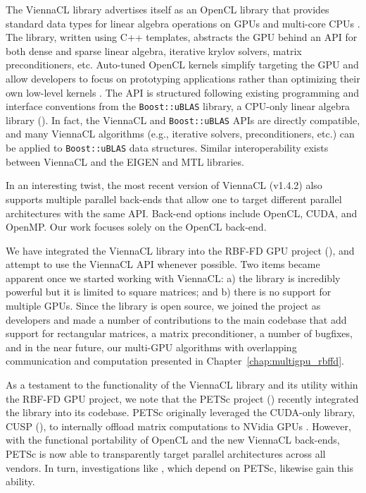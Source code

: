 \documentclass{report}
\begin{document}
The ViennaCL library advertises itself as an OpenCL library that provides standard data types for linear algebra operations on GPUs and multi-core CPUs \cite{Rupp2010}. The library, written using C++ templates, abstracts the GPU behind an API for both dense and sparse linear algebra, iterative krylov solvers, matrix preconditioners, etc. Auto-tuned OpenCL kernels simplify targeting the GPU and allow developers to focus on prototyping applications rather than optimizing their own low-level kernels \cite{Rupp2010a}. 
The API is structured following existing programming and interface conventions from the \texttt{Boost::uBLAS} library, a CPU-only linear algebra library (\cite{BoostSite}). In fact, the ViennaCL and \texttt{Boost::uBLAS} APIs are directly compatible, and many ViennaCL algorithms (e.g., iterative solvers, preconditioners, etc.) can be applied to \texttt{Boost::uBLAS} data structures. Similar interoperability exists between ViennaCL and the EIGEN and MTL libraries. 

In an interesting twist, the most recent version of ViennaCL (v1.4.2) also supports multiple parallel back-ends that allow one to target different parallel architectures with the same API. Back-end options include OpenCL, CUDA, and OpenMP. Our work focuses solely on the OpenCL back-end.

We have integrated the ViennaCL library into the RBF-FD GPU project (\cite{BolligRBFFDCode}), and attempt to use the ViennaCL API whenever possible. Two items became apparent once we started working with ViennaCL: a) the library is incredibly powerful but it is limited to square matrices; and b) there is no support for multiple GPUs. Since the library is open source, we joined the project as developers and made a number of contributions to the main codebase that add support for rectangular matrices, a matrix preconditioner, a number of bugfixes, and in the near future,  our multi-GPU algorithms with overlapping communication and computation presented in Chapter~\ref{chap:multigpu_rbffd}.

As a testament to the functionality of the ViennaCL library and its utility within the RBF-FD GPU project, we note that the PETSc project (\cite{petsc-web-page}) recently integrated the library into its codebase. PETSc originally leveraged the CUDA-only library, CUSP (\cite{Cusp2012}), to internally offload matrix computations to NVidia GPUs \cite{Minden2010}. However, with the functional portability of OpenCL and the new ViennaCL back-ends, PETSc is now able to transparently target parallel architectures across all vendors. In turn, investigations like \cite{Yokota2010,Yokota2012}, which depend on PETSc, likewise gain this ability. 
\end{document}
